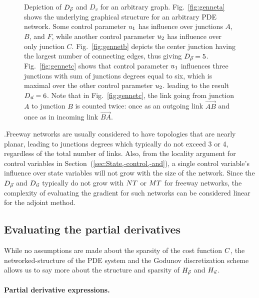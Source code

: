\begin{figure}
\begin{centering}
{		}
		\par\end{centering}
				
		\caption{Depiction of $D_{\vec{\rho}}$ and $D_{v}$ for an arbitrary graph. Fig.~\ref{fig:genneta}
			shows the underlying graphical structure for an arbitrary PDE network.
			Some control parameter $u_{1}$ has influence over junctions
			$A$, $B$, and $F$, while another control parameter $u_{2}$
			has influence over only junction $C$. Fig.~\ref{fig:gennetb}
			depicts the center junction having the largest number of connecting
			edges, thus giving $D_{\vec{\rho}}=5$. Fig.~\ref{fig:gennetc} shows
			that control parameter $u_{1}$ influences three junctions with
			sum of junctions degrees equal to six, which is maximal over the other
			control parameter $u_{2}$. leading to the result $D_{\vec{u}}=6$.
			Note that in Fig.~\ref{fig:gennetc}, the link going from junction
			$A$ to junction $B$ is counted twice: once as an outgoing link $\vec{AB}$
			and once as in incoming link $\vec{BA}$.\label{fig:Depicting--and}}
		\end{figure}
		.Freeway networks are usually considered to have topologies that are
		nearly planar, leading to junctions degrees which typically do not
		exceed 3 or 4, regardless of the total number of links. Also, from
		the locality argument for control variables in Section~(\ref{sec:State,-control,-and}),
		a single control variable's influence over state variables will not
		grow with the size of the network. Since the $D_{\vec{\rho}}$ and
		$D_{\vec{u}}$ typically do not grow with $NT$ or
		$MT$ for freeway networks, the complexity of evaluating
		the gradient for such networks can be considered linear for the adjoint
		method.
				
				
		\subsection{Evaluating the partial derivatives\label{sub:Evaluating--and}}
				
		While no assumptions are made about the sparsity of the cost function
		$C$, the networked-structure of the PDE system and the Godunov
		discretization scheme allows us to say more about the structure and
		sparsity of $H_{\vec{\rho}}$ and $H_{\vec{u}}$.
				
				
		\paragraph{Partial derivative expressions.}
				
